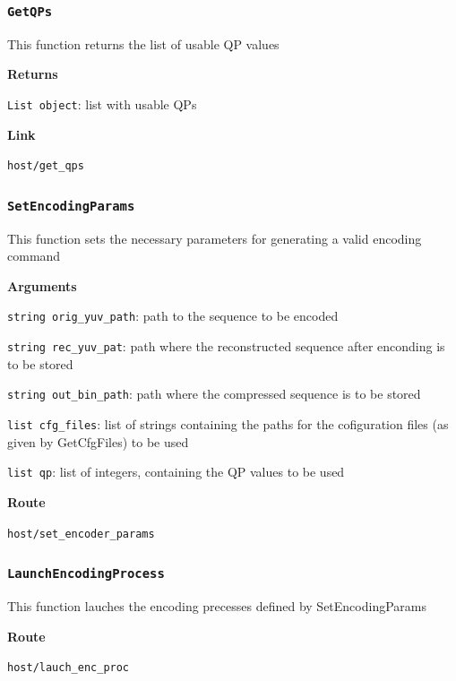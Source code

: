 \documentclass{article}
\begin{document}
\subsubsection*{\texttt{GetQPs}}

This function returns the list of usable QP values

\textbf{Returns}

\texttt{List object}: list with usable QPs

\textbf{Link}

\texttt{host/get_qps}


\subsubsection*{\texttt{SetEncodingParams}}

This function sets the necessary parameters for generating a valid encoding command

\textbf{Arguments}

\texttt{string orig_yuv_path}: path to the sequence to be encoded

\texttt{string rec_yuv_pat}: path where the reconstructed sequence after enconding is to be stored

\texttt{string out_bin_path}: path where the compressed sequence is to be stored

\texttt{list cfg_files}: list of strings containing the paths for the cofiguration files (as given by GetCfgFiles) to be used

\texttt{list qp}: list of integers, containing the QP values to be used

\textbf{Route}

\texttt{host/set_encoder_params}


\subsubsection*{\texttt{LaunchEncodingProcess}}

This function lauches the encoding precesses defined by SetEncodingParams

\textbf{Route}

\texttt{host/lauch_enc_proc}

\end{document}
